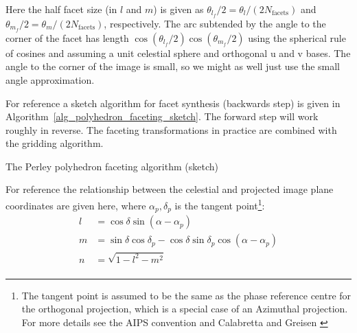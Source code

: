 Here the half facet size (in $l$ and $m$) is given as $\theta_{l_f}/2 = \theta_l/(2N_{\text{facets}})$ and $\theta_{m_f}/2 = \theta_m/(2N_{\text{facets}})$, respectively. The arc subtended by the angle to the corner of the facet has 
length $\cos{(\theta_{l_f}/2)}\cos{(\theta_{m_f}/2)}$ using the spherical rule of cosines and assuming a unit celestial sphere and orthogonal u and v bases. The angle to the corner of the image is small, so 
we might as well just use the small angle approximation.

For reference a sketch algorithm for facet synthesis (backwards step) is given in Algorithm~\ref{alg_polyhedron_faceting_sketch}. The forward
step will work roughly in reverse. The faceting transformations in practice are combined with the gridding algorithm.
\begin{algorithm}
  \begin{algorithmic}
    \ENDFOR
  \ENDFOR
  \end{algorithmic}
  \caption{The Perley polyhedron faceting algorithm (sketch)}
  \label{alg_polyhedron_faceting_sketch}
\end{algorithm}

For reference the relationship between the celestial and projected image plane coordinates are given here, where
$\alpha_p,\delta_p$ is the tangent point\footnote{The tangent point is assumed to be the same as the phase reference 
centre for the orthogonal projection, which is a special case of an Azimuthal projection. For more details see the 
AIPS convention \cite{aipsnonlinearcoords} and Calabretta and Greisen \cite{calabretta2002representations}}:
\begin{equation}
 \begin{split}
  l &= \cos{\delta}\sin{(\alpha-\alpha_p)}\\
  m &= \sin{\delta}\cos{\delta_p}-\cos{\delta}\sin{\delta_p}\cos{(\alpha-\alpha_p)}\\
  n &= \sqrt{1-l^2-m^2}\\
 \end{split}
\end{equation}

